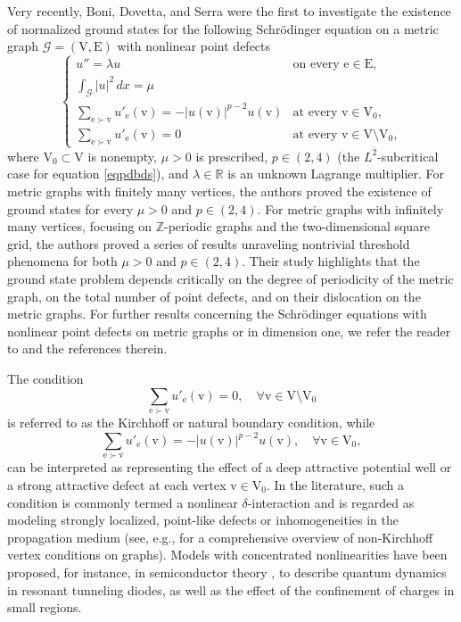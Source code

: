 \documentclass[11pt]{amsart}
\newcommand{\abs}[1]{\lvert#1\rvert}
\newcommand{\G}{\mathcal{G}}
\newcommand{\E}{\mathrm{E}}
\newcommand{\V}{\mathrm{V}}
\newcommand{\e}{\mathrm{e}}
\newcommand{\vv}{\mathrm{v}}
\numberwithin{equation}{section}
\begin{document}
Very recently, Boni, Dovetta, and Serra \cite{BDS} were the first to investigate the existence of normalized ground states for the following Schr\"odinger equation on a metric graph $\G=(\V,\E)$ with nonlinear point defects
\begin{equation} \label{eqpdbds}
    \begin{cases} 
u'' = \lambda u & \text{on every } \e \in \E, \\ 
\int_\G \abs{u}^2\, dx = \mu & \\
\displaystyle \sum_{\e \succ \vv}  u'_\e(\vv) = -|u(\vv)|^{p-2}u(\vv) & \text{at every } \vv \in \V_0, \\ 
\displaystyle \sum_{\e \succ \vv}  u'_\e(\vv) = 0 & \text{at every } \vv \in \V \setminus \V_0,
\end{cases}
\end{equation}
where $\V_0\subset \V$ is nonempty, $\mu>0$ is prescribed, $p \in (2,4)$ (the $L^2$-subcritical case for equation \eqref{eqpdbds}), and $\lambda \in \mathbb{R}$ is an unknown Lagrange multiplier. For metric graphs with finitely many vertices, the authors proved the existence of ground states for every $\mu > 0$ and $p \in (2,4)$.  For metric graphs with infinitely many vertices, focusing on $\mathbb{Z}$-periodic graphs and the two-dimensional square grid, the authors proved a series of results unraveling nontrivial threshold phenomena for both $\mu > 0$ and $p \in (2,4)$. Their study highlights that  the ground state problem depends critically on the degree of periodicity of the metric graph, on the total number of point defects, and on their dislocation on the metric graphs. For further results concerning the Schr\"{o}dinger equations with nonlinear point defects on metric graphs or in dimension one, we refer the reader to \cite{BD,BD2,BBDT,BBDT2} and the references therein.


The condition
$$
\sum_{\e \succ \vv} u'_\e(\vv) = 0,\quad \forall \vv \in \V \setminus \V_0
$$
is referred to as the Kirchhoff or natural boundary condition, while
$$
\sum_{\e \succ \vv} u'_\e(\vv) = -|u(\vv)|^{p-2}u(\vv), \quad \forall \vv \in \V_0,
$$
can be interpreted as representing the effect of a deep attractive potential well or a strong attractive defect at each vertex $\vv \in \V_0$. In the literature, such a condition is commonly termed a nonlinear $\delta$-interaction and is regarded as modeling strongly localized, point-like defects or inhomogeneities in the propagation medium (see, e.g., \cite{ABR} for a comprehensive overview of non-Kirchhoff vertex conditions on graphs). Models with concentrated nonlinearities have been proposed, for instance, in semiconductor theory \cite{JPS, Ni}, to describe quantum dynamics in resonant tunneling diodes, as well as the effect of the confinement of charges in small regions.
\end{document}
